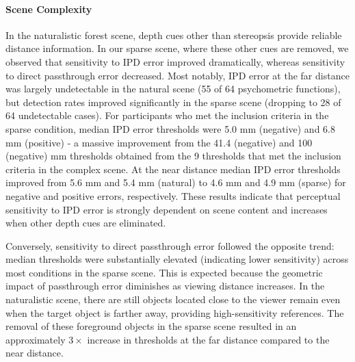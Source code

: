 \paragraph{Scene Complexity}
In the naturalistic forest scene, depth cues other than stereopsis provide reliable distance information. In our sparse scene, where these other cues are removed, we observed that sensitivity to IPD error improved dramatically, whereas sensitivity to direct passthrough error decreased. Most notably, IPD error at the far distance was largely undetectable in the natural scene (55 of 64 psychometric functions), but detection rates improved significantly in the sparse scene (dropping to 28 of 64 undetectable cases). For participants who met the inclusion criteria in the sparse condition, median IPD error thresholds were 5.0 mm (negative) and 6.8 mm (positive) - a massive improvement from the 41.4 (negative) and 100 (negative) mm thresholds obtained from the 9 thresholds that met the inclusion criteria in the complex scene. At the near distance median IPD error thresholds improved from 5.6 mm and 5.4 mm (natural) to 4.6 mm and 4.9 mm (sparse) for negative and positive errors, respectively. These results indicate that perceptual sensitivity to IPD error is strongly dependent on scene content and increases when other depth cues are eliminated.

Conversely, sensitivity to direct passthrough error followed the opposite trend: median thresholds were substantially elevated (indicating lower sensitivity) across most conditions in the sparse scene. This is expected because the geometric impact of passthrough error diminishes as viewing distance increases. In the naturalistic scene, there are still objects located close to the viewer remain even when the target object is farther away, providing high-sensitivity references. The removal of these foreground objects in the sparse scene resulted in an approximately $3\times$ increase in thresholds at the far distance compared to the near distance.


